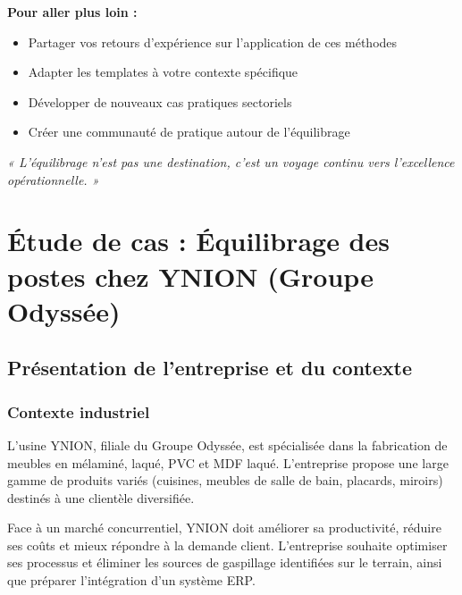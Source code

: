 \documentclass[12pt,a4paper]{article}
\begin{document}
\begin{center}
\vspace{0.5cm}

\noindent \textbf{Pour aller plus loin :}
\begin{itemize}
    \item Partager vos retours d'expérience sur l'application de ces méthodes
    \item Adapter les templates à votre contexte spécifique
    \item Développer de nouveaux cas pratiques sectoriels
    \item Créer une communauté de pratique autour de l'équilibrage
\end{itemize}

\vspace{0.5cm}

\noindent \textit{« L'équilibrage n'est pas une destination, c'est un voyage continu vers l'excellence opérationnelle. »}


\section{Étude de cas : Équilibrage des postes chez YNION (Groupe Odyssée)}

\subsection{Présentation de l'entreprise et du contexte}

\subsubsection{Contexte industriel}
L'usine YNION, filiale du Groupe Odyssée, est spécialisée dans la fabrication de meubles en mélaminé, laqué, PVC et MDF laqué. L'entreprise propose une large gamme de produits variés (cuisines, meubles de salle de bain, placards, miroirs) destinés à une clientèle diversifiée.

Face à un marché concurrentiel, YNION doit améliorer sa productivité, réduire ses coûts et mieux répondre à la demande client. L'entreprise souhaite optimiser ses processus et éliminer les sources de gaspillage identifiées sur le terrain, ainsi que préparer l'intégration d'un système ERP.


\end{center}
\end{document}
